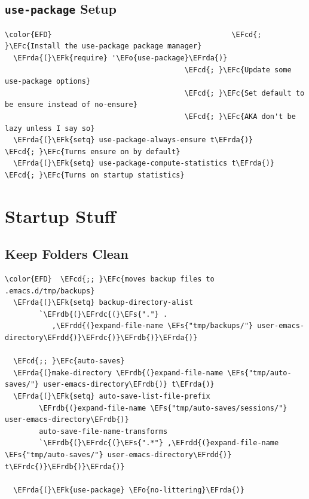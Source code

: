 \documentclass[11pt]{article}
\newcommand{\EFc}[1]{\textcolor{EFc}{#1}} %
\newcommand{\EFcd}[1]{\textcolor{EFcd}{#1}} %
\newcommand{\EFs}[1]{\textcolor{EFs}{#1}} %
\newcommand{\EFk}[1]{\textcolor{EFk}{#1}} %
\newcommand{\EFo}[1]{\textcolor{EFo}{#1}} %
\newcommand{\EFrda}[1]{\textcolor{EFrda}{#1}} %
\newcommand{\EFrdb}[1]{\textcolor{EFrdb}{#1}} %
\newcommand{\EFrdc}[1]{\textcolor{EFrdc}{#1}} %
\newcommand{\EFrdd}[1]{\textcolor{EFrdd}{#1}} %
\begin{document}
\subsection{\texttt{use-package} Setup}
\label{sec:orge801d1e}
\begin{Code}
\begin{Verbatim}
\color{EFD}                                          \EFcd{; }\EFc{Install the use-package package manager}
  \EFrda{(}\EFk{require} '\EFo{use-package}\EFrda{)}
                                          \EFcd{; }\EFc{Update some use-package options}
                                          \EFcd{; }\EFc{Set default to be ensure instead of no-ensure}
                                          \EFcd{; }\EFc{AKA don't be lazy unless I say so}
  \EFrda{(}\EFk{setq} use-package-always-ensure t\EFrda{)}       \EFcd{; }\EFc{Turns ensure on by default}
  \EFrda{(}\EFk{setq} use-package-compute-statistics t\EFrda{)}  \EFcd{; }\EFc{Turns on startup statistics}
\end{Verbatim}
\end{Code}

\section{Startup Stuff}
\label{sec:org61f4453}
\subsection{Keep Folders Clean}
\label{sec:org3504d25}
\begin{Code}
\begin{Verbatim}
\color{EFD}  \EFcd{;; }\EFc{moves backup files to .emacs.d/tmp/backups}
  \EFrda{(}\EFk{setq} backup-directory-alist
        `\EFrdb{(}\EFrdc{(}\EFs{"."} .
           ,\EFrdd{(}expand-file-name \EFs{"tmp/backups/"} user-emacs-directory\EFrdd{)}\EFrdc{)}\EFrdb{)}\EFrda{)}

  \EFcd{;; }\EFc{auto-saves}
  \EFrda{(}make-directory \EFrdb{(}expand-file-name \EFs{"tmp/auto-saves/"} user-emacs-directory\EFrdb{)} t\EFrda{)}
  \EFrda{(}\EFk{setq} auto-save-list-file-prefix
        \EFrdb{(}expand-file-name \EFs{"tmp/auto-saves/sessions/"} user-emacs-directory\EFrdb{)}
        auto-save-file-name-transforms
        `\EFrdb{(}\EFrdc{(}\EFs{".*"} ,\EFrdd{(}expand-file-name \EFs{"tmp/auto-saves/"} user-emacs-directory\EFrdd{)} t\EFrdc{)}\EFrdb{)}\EFrda{)}

  \EFrda{(}\EFk{use-package} \EFo{no-littering}\EFrda{)}
\end{Verbatim}
\end{Code}
\end{document}
